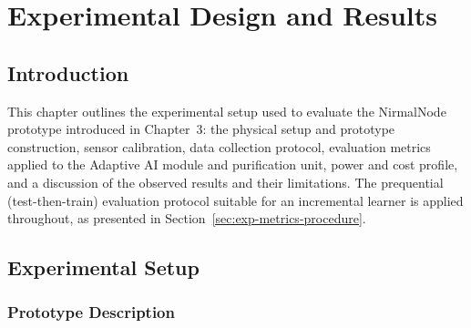 \chapter{Experimental Design and Results}
\label{ch:experimental}

\section{Introduction}
\label{sec:exp-intro}

This chapter outlines the experimental setup used to evaluate the NirmalNode prototype introduced in Chapter~3: the physical setup and prototype construction, sensor calibration, data collection protocol, evaluation metrics applied to the Adaptive AI module and purification unit, power and cost profile, and a discussion of the observed results and their limitations. The prequential (test-then-train) evaluation protocol suitable for an incremental learner is applied throughout, as presented in Section~\ref{sec:exp-metrics-procedure}.

\section{Experimental Setup}
\label{sec:exp-setup}

\subsection{Prototype Description}
\label{sec:exp-prototype}

